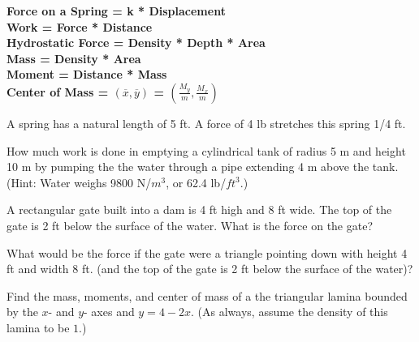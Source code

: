 \documentclass[12pt]{exam}
\begin{document}
\textbf{\hspace{-.3in}
Force on a Spring = k * Displacement\\
Work = Force * Distance \\
Hydrostatic Force = Density * Depth * Area\\
Mass = Density * Area\\
Moment = Distance * Mass\\
Center of Mass = $(\overline{x},\overline{y})$ = $\left(\frac{M_y}{m},
\frac{M_x}{m}\right)$
}

\begin{questions}

\question A spring has a natural length of 5 ft.  A force of
4 lb stretches this spring 1/4 ft.  

\question How much work is done in emptying a cylindrical tank of 
radius 5 m and height 10 m by pumping the the water through a 
pipe extending 4 m above the tank.  (Hint: Water weighs 9800 N/$m^3$, or
62.4 lb/$ft^3$.)


\question A rectangular gate built into a dam is 4 ft high and 8 ft wide.
The top of the gate is 2 ft below the surface of the water.  What is the 
force on the gate?

\question What would be  the force if the gate were a triangle pointing
down with height 4 ft and width 8 ft.
 (and the top of the gate is 2 ft below the surface of the water)?

\question Find the mass, moments, and center of mass of a the
triangular lamina bounded by the $x$- and $y$- axes and $y=4-2x$.
(As always, assume the density of this lamina to be $1$.)










\end{questions}
\end{document}
